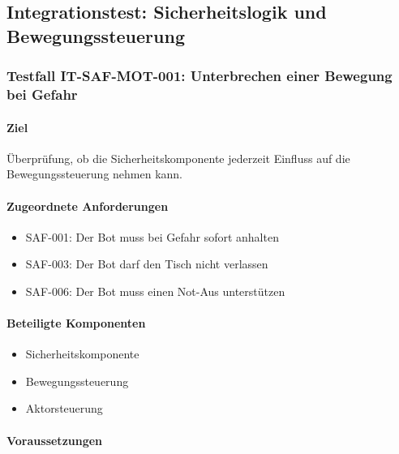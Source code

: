 \subsection{Integrationstest: Sicherheitslogik und
Bewegungssteuerung}\label{integrationstest-sicherheitslogik-und-bewegungssteuerung}

\subsubsection{Testfall IT-SAF-MOT-001: Unterbrechen einer Bewegung bei
Gefahr}\label{testfall-it-saf-mot-001-unterbrechen-einer-bewegung-bei-gefahr}

\paragraph{Ziel}\label{ziel-12}

Überprüfung, ob die Sicherheitskomponente jederzeit Einfluss auf die
Bewegungssteuerung nehmen kann.

\paragraph{Zugeordnete
Anforderungen}\label{zugeordnete-anforderungen-12}

\begin{itemize}
\tightlist
\item
  SAF-001: Der Bot muss bei Gefahr sofort anhalten
\item
  SAF-003: Der Bot darf den Tisch nicht verlassen
\item
  SAF-006: Der Bot muss einen Not-Aus unterstützen
\end{itemize}

\paragraph{Beteiligte Komponenten}\label{beteiligte-komponenten-3}

\begin{itemize}
\tightlist
\item
  Sicherheitskomponente
\item
  Bewegungssteuerung
\item
  Aktorsteuerung
\end{itemize}

\paragraph{Voraussetzungen}\label{voraussetzungen-12}


